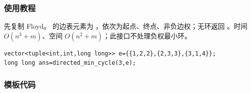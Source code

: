 \subsubsection*{使用教程}
先复制 Floyd。 的边表元素为 ，依次为起点、终点、非负边权；无环返回 。时间 $O(n^3+m)$、空间 $O(n^2+m)$；此接口不处理负权最小环。
\begin{lstlisting}[style=mtycpp,numbers=none]
vector<tuple<int,int,long long>> e={{1,2,2},{2,3,3},{3,1,4}};
long long ans=directed_min_cycle(3,e);
\end{lstlisting}

\subsubsection*{模板代码}
